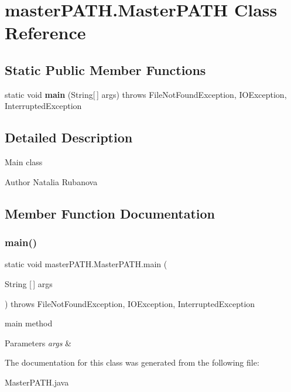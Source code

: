 \section{master\+P\+A\+T\+H.\+Master\+P\+A\+TH Class Reference}
\label{classmaster_p_a_t_h_1_1_master_p_a_t_h}
\subsection*{Static Public Member Functions}
\begin{DoxyCompactItemize}
\item 
static void \textbf{ main} (String[$\,$] args)  throws File\+Not\+Found\+Exception, I\+O\+Exception, Interrupted\+Exception 
\end{DoxyCompactItemize}


\subsection{Detailed Description}
Main class

\begin{DoxyAuthor}{Author}
Natalia Rubanova 
\end{DoxyAuthor}


\subsection{Member Function Documentation}
\mbox{\label{classmaster_p_a_t_h_1_1_master_p_a_t_h_a83b37a64dbcce1092579aea24b717098}} 
\subsubsection{main()}
{\footnotesize\ttfamily static void master\+P\+A\+T\+H.\+Master\+P\+A\+T\+H.\+main (\begin{DoxyParamCaption}\item[{String [$\,$]}]{args }\end{DoxyParamCaption}) throws File\+Not\+Found\+Exception, I\+O\+Exception, Interrupted\+Exception\hspace{0.3cm}{\ttfamily [static]}}

main method 
\begin{DoxyParams}{Parameters}
{\em args} & \\
\hline
\end{DoxyParams}


The documentation for this class was generated from the following file\+:\begin{DoxyCompactItemize}
\item 
Master\+P\+A\+T\+H.\+java\end{DoxyCompactItemize}
